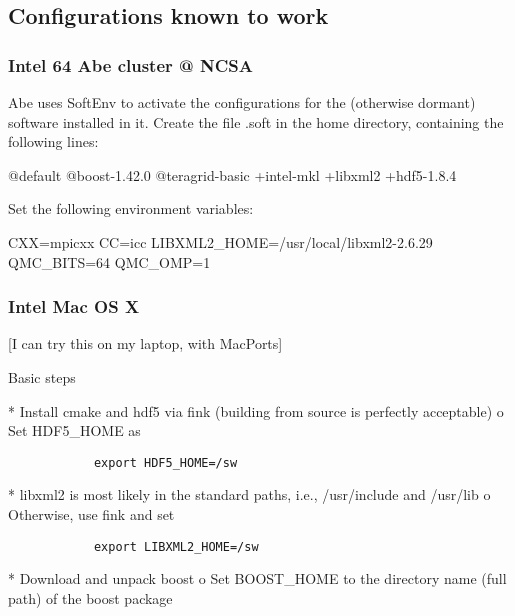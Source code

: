 
\subsection{Configurations known to work}
\subsubsection{Intel 64 Abe cluster @ NCSA}
Abe uses SoftEnv to activate the configurations for the (otherwise dormant) software installed in it.  Create the file .soft in the home directory, containing the following lines:
\begin{term}
@default
@boost-1.42.0
@teragrid-basic
+intel-mkl
+libxml2
+hdf5-1.8.4
\end{term}
Set the following environment variables:
\begin{term}
CXX=mpicxx
CC=icc
LIBXML2\_HOME=/usr/local/libxml2-2.6.29
QMC\_BITS=64
QMC\_OMP=1
\end{term}

\subsubsection{Intel Mac OS X}
[I can try this on my laptop, with MacPorts]

Basic steps

    * Install cmake and hdf5 via fink (building from source is perfectly acceptable)
          o Set HDF5\_HOME as

\begin{verbatim}
            export HDF5_HOME=/sw
\end{verbatim}

    * libxml2 is most likely in the standard paths, i.e., /usr/include and /usr/lib
          o Otherwise, use fink and set

\begin{verbatim}
            export LIBXML2_HOME=/sw
\end{verbatim}

    * Download and unpack boost
          o Set BOOST\_HOME to the directory name (full path) of the boost package 

